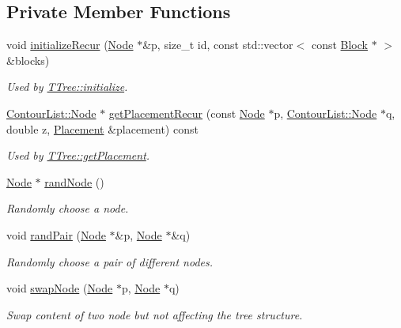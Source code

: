 \subsection*{Private Member Functions}
\begin{DoxyCompactItemize}
\item 
void \hyperlink{classTTree_aa4a9d2b247a7f9c33d1834fd23de7cca}{initialize\+Recur} (\hyperlink{structTTree_1_1Node}{Node} $\ast$\&p, size\+\_\+t id, const std\+::vector$<$ const \hyperlink{structBlock}{Block} $\ast$ $>$ \&blocks)
\begin{DoxyCompactList}\small\item\em Used by \hyperlink{classTTree_a7be152bf003a3b7a41a0d2f2b8a60dcb}{T\+Tree\+::initialize}. \end{DoxyCompactList}\item 
\hyperlink{structContourList_1_1Node}{Contour\+List\+::\+Node} $\ast$ \hyperlink{classTTree_a4852b91528cb10c01d05a2ff8f20fe4b}{get\+Placement\+Recur} (const \hyperlink{structTTree_1_1Node}{Node} $\ast$p, \hyperlink{structContourList_1_1Node}{Contour\+List\+::\+Node} $\ast$q, double z, \hyperlink{classPlacement}{Placement} \&placement) const 
\begin{DoxyCompactList}\small\item\em Used by \hyperlink{classTTree_a7e34e70567be7961d4a5683010746aae}{T\+Tree\+::get\+Placement}. \end{DoxyCompactList}\item 
\hyperlink{structTTree_1_1Node}{Node} $\ast$ \hyperlink{classTTree_acd9ed57c09bb59a5fcf618b8e215d584}{rand\+Node} ()
\begin{DoxyCompactList}\small\item\em Randomly choose a node. \end{DoxyCompactList}\item 
void \hyperlink{classTTree_aa756d0b900bc757b8095993d86fa5bd9}{rand\+Pair} (\hyperlink{structTTree_1_1Node}{Node} $\ast$\&p, \hyperlink{structTTree_1_1Node}{Node} $\ast$\&q)
\begin{DoxyCompactList}\small\item\em Randomly choose a pair of different nodes. \end{DoxyCompactList}\item 
void \hyperlink{classTTree_adbb05d027840467cdce8b9489bc49225}{swap\+Node} (\hyperlink{structTTree_1_1Node}{Node} $\ast$p, \hyperlink{structTTree_1_1Node}{Node} $\ast$q)
\begin{DoxyCompactList}\small\item\em Swap content of two node but not affecting the tree structure. \end{DoxyCompactList}\item 

\end{DoxyCompactItemize}
